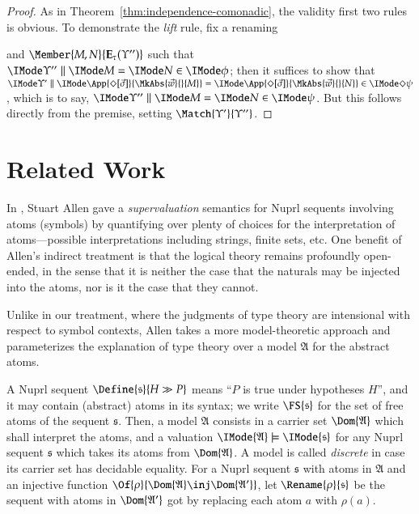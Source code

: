 \documentclass[11pt]{article}
\theoremstyle{definition}
\theoremstyle{notation}
\theoremstyle{remark}
\numberwithin{equation}{section}
\newcommand\Exprs{\mathbf{E}}
\begin{document}
\begin{proof}

  As in Theorem~\ref{thm:independence-comonadic}, the validity first two rules
  is obvious. To demonstrate the \textit{lift} rule, fix a renaming
  and $\Member{M,N}{\Exprs_\tau(\Upsilon'')}$ such that
  $\RMemEq{\Upsilon''}{M}{N}{\phi}$; then it suffices to show that
  $\RMemEq{\Upsilon'}{\App{\Diamond[\vec{\sigma}]}{\MkAbs{\vec{w}}{}{M}}}{\App{\Diamond[\vec{\sigma}]}{\MkAbs{\vec{w}}{}{N}}}{\Diamond\psi}$, which is to say,
  $\RMemEq{\Upsilon''}{M}{N}{\psi}$. But this follows directly from the premise, setting $\Match{\Upsilon'}{\Upsilon''}$.

\end{proof}

\section{Related Work}

In \cite{allen:2006}, Stuart Allen gave a \emph{supervaluation} semantics for
Nuprl sequents involving atoms (symbols) by quantifying over plenty of choices
for the interpretation of atoms---possible interpretations including strings,
finite sets, etc. One benefit of Allen's indirect treatment is that the logical
theory remains profoundly open-ended, in the sense that it is neither the case
that the naturals may be injected into the atoms, nor is it the case that they
cannot.

\newcommand\AtomModel{\mathfrak{A}}
\newcommand\NuprlSeq[2]{\IMode{#1}\gg\IMode{#2}}
\newcommand\NuprlInterp[2]{\IMode{#1}\models\IMode{#2}}
\newcommand\NuprlInterpSeq[3]{\IMode{#1}\models\NuprlSeq{#2}{#3}}
\newcommand\Strings{\mathbf{String}}

Unlike in our treatment, where the judgments of type theory are intensional
with respect to symbol contexts, Allen takes a more model-theoretic approach
and parameterizes the explanation of type theory over a model $\AtomModel$ for
the abstract atoms.

A Nuprl sequent $\Define{\mathfrak{s}}{H\gg P}$ means ``$P$ is true under
hypotheses $H$'', and it may contain (abstract) atoms in its syntax; we write
$\FS{\mathfrak{s}}$ for the set of free atoms of the sequent $\mathfrak{s}$.
Then, a model $\AtomModel$ consists in a carrier set $\Dom{\AtomModel}$ which
shall interpret the atoms, and a valuation
$\NuprlInterp{\AtomModel}{\mathfrak{s}}$ for any Nuprl sequent $\mathfrak{s}$
which takes its atoms from $\Dom{\AtomModel}$.  A model is called
\emph{discrete} in case its carrier set has decidable equality.  For a Nuprl
sequent $\mathfrak{s}$ with atoms in $\AtomModel$ and an injective function
$\Of{\rho}{\Dom{\AtomModel}\inj\Dom{\AtomModel'}}$, let
$\Rename{\rho}{\mathfrak{s}}$ be the sequent with atoms in $\Dom{\AtomModel'}$
got by replacing each atom $a$ with $\rho(a)$.
\end{document}
